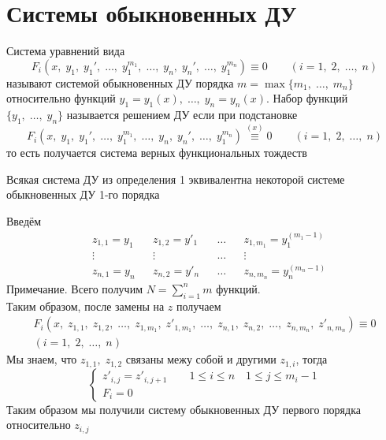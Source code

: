 \author{Tkachuk Andrei}

\section{Системы обыкновенных ДУ}

\begin{Def}
    Система уравнений вида
    \[
        F_i(x,\; y_1,\; y_1',\; \dots,\; y_1^{m_1},\; \dots,\; y_n,\; y_n',\; \dots,\; y_1^{m_n}) \equiv 0 \qquad (i = 1,\; 2,\; \dots,\; n)
    \]
    называют системой обыкновенных ДУ порядка $m = \max\{m_1,\; \dots,\; m_n\}$ относительно функций 
    $y_1 = y_1(x),\; \dots,\; y_n = y_n(x)$. Набор функций $\{y_1,\; \dots,\; y_n\}$ называется решением ДУ если при подстановке 
    \[
        F_i(x,\; y_1,\; y_1',\; \dots,\; y_1^{m_1},\; \dots,\; y_n,\; y_n',\; \dots,\; y_1^{m_n}) \stackrel{(x)}{\equiv} 0 \qquad (i = 1,\; 2,\; \dots,\; n)
    \]
    то есть получается система верных функциональных тождеств 
\end{Def}

\begin{Th}
    Всякая система ДУ из определения 1 эквивалентна некоторой системе обыкновенных ДУ 1-го порядка
\end{Th}

\begin{Proof}
    Введём
    \begin{align*}
        & z_{1,1} = y_1 && z_{1,2} = y'_1 && \dots && z_{1,m_1} = y^{(m_1-1)}_1 \\
        &\vdots && \vdots && \dots && \vdots \\
        & z_{n,1} = y_n && z_{n,2} = y'_n && \dots && z_{n,m_n} = y^{(m_n-1)}_n
    \end{align*}
    Примечание. Всего получим $N = \sum_{i=1}^{n} m$ функций.\\
    Таким образом, после замены на $z$ получаем
    \begin{multline*}
        F_i(x,\; z_{1,1},\; z_{1,2},\; \dots,\; z_{1,m_1},\; z'_{1,m_1},\; \dots,\; z_{n,1},\; z_{n,2},\; \dots,\; z_{n,m_n},\; z'_{n,m_n}) \equiv 0\\
        (i = 1,\; 2,\; \dots,\; n)
    \end{multline*}
    Мы знаем, что $z_{1,1},\; z_{1,2}$ связаны межу собой и другими $z_{1,i}$, тогда
    \[
        \begin{cases}
            z'_{i,j} = z'_{i,j + 1} \qquad 1\leqslant i \leqslant n \quad 1\leqslant j \leqslant m_i - 1\\
            F_i = 0
        \end{cases}
    \]
    Таким образом мы получили систему обыкновенных ДУ первого порядка относительно $z_{i,j}$ 
\end{Proof}

